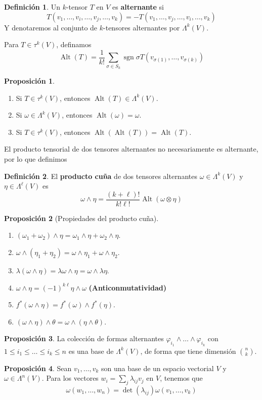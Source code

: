\documentclass[spanish]{book}
\theoremstyle{definition}
\newtheorem*{defn}{Definición}
\newtheorem*{prop}{Proposición}
\DeclareMathOperator{\Alt}{Alt}
\DeclareMathOperator{\sgn}{sgn}
\begin{document}
	\begin{defn}
		Un $k$-tensor $T$ en $V$ es \textbf{alternante} si
		\[T(v_1,\ldots,v_i,\ldots,v_j,\ldots,v_k)=-T(v_1,\ldots,v_j,\ldots,v_i,\ldots,v_k)\]
		Y denotaremos al conjunto de $k$-tensores alternantes por $\Lambda^k(V)$.
	\end{defn}
	Para $T\in\tau^k(V)$, definamos
	\[	\Alt(T)=\frac{1}{k!}\sum_{\sigma\in S_k}\sgn\sigma T(v_{\sigma(1)},\ldots,v_{\sigma(k)})\]
	\begin{prop}\leavevmode
		\begin{enumerate}
			\item Si $T\in\tau^k(V)$, entonces $\Alt(T)\in\Lambda^k(V)$.
			\item Si $\omega\in\Lambda^k(V)$, entonces $\Alt(\omega)=\omega$.
			\item  Si $T\in\tau^k(V)$, entonces $\Alt(\Alt(T))=\Alt(T)$.
		\end{enumerate}
	\end{prop}
	El producto tensorial de dos tensores alternantes no necesariamente es alternante, por lo que definimos
	\begin{defn}
		El \textbf{producto cuña} de dos tensores alternantes $\omega\in\Lambda^k(V)$ y $\eta\in\Lambda^\ell(V)$ es 
		\[\omega\wedge\eta=\frac{(k+\ell)!}{k!\ell!}\Alt(\omega\otimes\eta)\]
	\end{defn}
	\begin{prop}[Propiedades del producto cuña]\leavevmode
		\begin{enumerate}
			\item $(\omega_1+\omega_2)\wedge\eta=\omega_1\wedge\eta+\omega_2\wedge\eta$.
			\item $\omega\wedge(\eta_1+\eta_2)=\omega\wedge\eta_1+\omega\wedge\eta_2$.
			\item $\lambda(\omega\wedge\eta)=\lambda\omega\wedge\eta=\omega\wedge\lambda\eta$.
			\item $\omega\wedge\eta=(-1)^{k\ell}\eta\wedge\omega$ \textbf{(Anticonmutatividad)}
			\item $f^*(\omega\wedge\eta)=f^*(\omega)\wedge f^*(\eta)$.
			\item $(\omega\wedge\eta)\wedge\theta=\omega\wedge(\eta\wedge\theta)$.
		\end{enumerate}
	\end{prop}
	\begin{prop}\label{prop:base-kth-exterior-power}
		La colección de formas alternantes $\varphi_ {i_1}\wedge\ldots\wedge\varphi_{i_k}$ con $1\leq i_1\leq\ldots\leq i_k\leq n$ es una base de $\Lambda^k(V)$, de forma que tiene dimensión $\binom{n}{k}$.
	\end{prop}
	\begin{prop}
		Sean $v_1,\ldots,v_k$ son una base de un espacio vectorial $V$ y $\omega\in\Lambda^n(V)$. Para los vectores $w_i=\sum_j\lambda_{ij}v_j$ en $V$, tenemos que
		\[\omega(w_1,\ldots,w_n)=\det(\lambda_{ij})\omega(v_1,\ldots,v_k)\]
	\end{prop}
	
\end{document}

